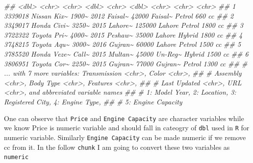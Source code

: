 \documentclass[
  letterpaper,
  DIV=11,
  numbers=noendperiod]{scrartcl}
\newenvironment{Shaded}{\begin{snugshade}}{\end{snugshade}}
\newcommand{\DocumentationTok}[1]{\textcolor[rgb]{0.37,0.37,0.37}{\textit{#1}}}
\begin{document}
\begin{Shaded}
\begin{Highlighting}[]
\DocumentationTok{\#\#     \textless{}dbl\textgreater{} \textless{}chr\textgreater{}       \textless{}chr\textgreater{}   \textless{}dbl\textgreater{} \textless{}chr\textgreater{}     \textless{}dbl\textgreater{} \textless{}chr\textgreater{}   \textless{}chr\textgreater{}   \textless{}chr\textgreater{}  }
\DocumentationTok{\#\# 1 3339018 Nissan Kix\textasciitilde{} 1900\textasciitilde{}    2012 Faisal\textasciitilde{}   42000 Faisal\textasciitilde{} Petrol  660 cc }
\DocumentationTok{\#\# 2 3349017 Honda Civi\textasciitilde{} 3250\textasciitilde{}    2015 Lahore\textasciitilde{}  125000 Lahore  Petrol  1800 cc}
\DocumentationTok{\#\# 3 3722322 Toyota Pri\textasciitilde{} 4000\textasciitilde{}    2015 Peshaw\textasciitilde{}   35000 Lahore  Hybrid  1800 cc}
\DocumentationTok{\#\# 4 3748215 Toyota Aqu\textasciitilde{} 3000\textasciitilde{}    2016 Gujran\textasciitilde{}   60000 Lahore  Petrol  1500 cc}
\DocumentationTok{\#\# 5 3785520 Honda Veze\textasciitilde{} Call\textasciitilde{}    2015 Multan\textasciitilde{}   45000 Un{-}Reg\textasciitilde{} Hybrid  1500 cc}
\DocumentationTok{\#\# 6 3806951 Toyota Cor\textasciitilde{} 2250\textasciitilde{}    2015 Gujran\textasciitilde{}   77000 Gujran\textasciitilde{} Petrol  1300 cc}
\DocumentationTok{\#\# \# ... with 7 more variables: Transmission \textless{}chr\textgreater{}, Color \textless{}chr\textgreater{},}
\DocumentationTok{\#\# \#   Assembly \textless{}chr\textgreater{}, \textasciigrave{}Body Type\textasciigrave{} \textless{}chr\textgreater{}, Features \textless{}chr\textgreater{},}
\DocumentationTok{\#\# \#   \textasciigrave{}Last Updated\textasciigrave{} \textless{}chr\textgreater{}, URL \textless{}chr\textgreater{}, and abbreviated variable names}
\DocumentationTok{\#\# \#   1: \textasciigrave{}Model Year\textasciigrave{}, 2: Location, 3: \textasciigrave{}Registered City\textasciigrave{}, 4: \textasciigrave{}Engine Type\textasciigrave{},}
\DocumentationTok{\#\# \#   5: \textasciigrave{}Engine Capacity\textasciigrave{}}
\end{Highlighting}
\end{Shaded}

One can observe that \texttt{Price} and \texttt{Engine\ Capacity} are
character variables while we know Price is numeric variable and should
fall in cateogry of \texttt{dbl} used in \texttt{R} for numeric
variable. Similarly \texttt{Engine\ Capacity} can be made numeric if we
remove cc from it. In the follow \texttt{chunk} I am going to convert
these two variables as \texttt{numeric}
\end{document}
